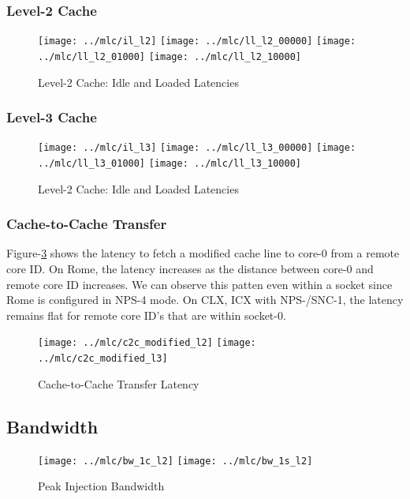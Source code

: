 \documentclass{article}
\begin{document}
\subsubsection{Level-2 Cache}
\begin{figure}[!ht]
    \centering
    \texttt{[image: ../mlc/il\_l2]}
    \texttt{[image: ../mlc/ll\_l2\_00000]}
    \texttt{[image: ../mlc/ll\_l2\_01000]}
    \texttt{[image: ../mlc/ll\_l2\_10000]}
    \caption{Level-2 Cache: Idle and Loaded Latencies}
    \label{figure:mlc_lat_l2}
\end{figure}
\subsubsection{Level-3 Cache}
\begin{figure}[!ht]
    \centering
    \texttt{[image: ../mlc/il\_l3]}
    \texttt{[image: ../mlc/ll\_l3\_00000]}
    \texttt{[image: ../mlc/ll\_l3\_01000]}
    \texttt{[image: ../mlc/ll\_l3\_10000]}
    \caption{Level-2 Cache: Idle and Loaded Latencies}
    \label{figure:mlc_lat_l3}
\end{figure}
\subsubsection{Cache-to-Cache Transfer}
Figure-\ref{figure:mlc_c2c_modified} shows the latency to fetch a modified cache line to core-0 from a remote core ID. On Rome, the latency increases as the distance between core-0 and remote core ID increases. We can observe this patten even within a socket since Rome is configured in NPS-4 mode. On CLX, ICX with NPS-/SNC-1, the latency remains flat for remote core ID's that are within socket-0.
\begin{figure}[!hb]
    \centering
    \texttt{[image: ../mlc/c2c\_modified\_l2]}
    \texttt{[image: ../mlc/c2c\_modified\_l3]}
    \caption{Cache-to-Cache Transfer Latency}
    \label{figure:mlc_c2c_modified}
\end{figure}

\subsection{Bandwidth}

\begin{figure}[!hb]
    \centering
    \texttt{[image: ../mlc/bw\_1c\_l2]}
    \texttt{[image: ../mlc/bw\_1s\_l2]}
    \caption{Peak Injection Bandwidth}
    \label{figure:mlc_bw}
\end{figure}
\end{document}
